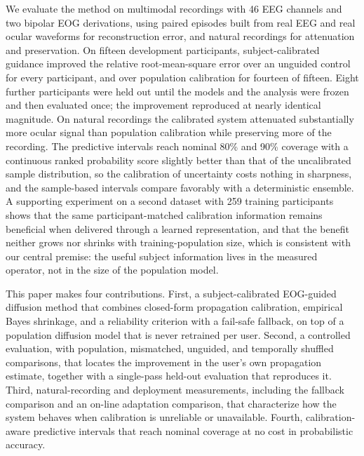 We evaluate the method on multimodal recordings with 46 EEG channels and two bipolar EOG derivations, using paired episodes built from real EEG and real ocular waveforms for reconstruction error, and natural recordings for attenuation and preservation. On fifteen development participants, subject-calibrated guidance improved the relative root-mean-square error over an unguided control for every participant, and over population calibration for fourteen of fifteen. Eight further participants were held out until the models and the analysis were frozen and then evaluated once; the improvement reproduced at nearly identical magnitude. On natural recordings the calibrated system attenuated substantially more ocular signal than population calibration while preserving more of the recording. The predictive intervals reach nominal 80\% and 90\% coverage with a continuous ranked probability score slightly better than that of the uncalibrated sample distribution, so the calibration of uncertainty costs nothing in sharpness, and the sample-based intervals compare favorably with a deterministic ensemble. A supporting experiment on a second dataset with 259 training participants shows that the same participant-matched calibration information remains beneficial when delivered through a learned representation, and that the benefit neither grows nor shrinks with training-population size, which is consistent with our central premise: the useful subject information lives in the measured operator, not in the size of the population model.

This paper makes four contributions. First, a subject-calibrated EOG-guided diffusion method that combines closed-form propagation calibration, empirical Bayes shrinkage, and a reliability criterion with a fail-safe fallback, on top of a population diffusion model that is never retrained per user. Second, a controlled evaluation, with population, mismatched, unguided, and temporally shuffled comparisons, that locates the improvement in the user's own propagation estimate, together with a single-pass held-out evaluation that reproduces it. Third, natural-recording and deployment measurements, including the fallback comparison and an on-line adaptation comparison, that characterize how the system behaves when calibration is unreliable or unavailable. Fourth, calibration-aware predictive intervals that reach nominal coverage at no cost in probabilistic accuracy.
